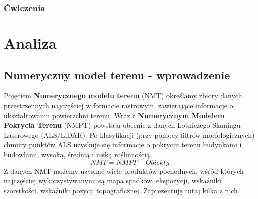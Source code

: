 \documentclass[a4paper,11pt, onecolumn, openany]{memoir}
\begin{document}
		\section{Ćwiczenia}

\part{Analiza}
	\chapter{Numeryczny model terenu - wprowadzenie}
		Pojęciem \textbf{Numerycznego modelu terenu} (NMT) określamy zbiory danych przestrzennych najczęściej w formacie rastrowym, zawierające informacje o ukształtowaniu powierzchni terenu. Wraz z \textbf{Numerycznym Modelem Pokrycia Terenu} (NMPT) powstają obecnie z danych Lotniczego Skaningu Laserowego (ALS/LiDAR). Po klasyfikacji (przy pomocy filtrów morfologicznych) chmury punktów ALS uzyskuje się informacje o pokryciu terenu budynkami i budowlami, wysoką, średnią i niską roślinnością.
		\begin{equation}\label{rownanienmt}
		NMT = NMPT - Obiekty
		\end{equation}
		Z danych NMT możemy uzyskać wiele produktów pochodnych, wśród których najczęściej wykorzystywanymi są mapa spadków, ekspozycji, wskaźniki szorstkości, wskaźniki pozycji topograficznej. Zaprezentuję tutaj kilka z nich.
\end{document}
